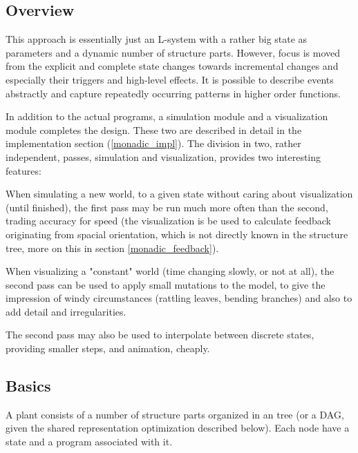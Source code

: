 




\subsection{Overview}


    This approach is essentially just an L-system with a
    rather big state as parameters and a dynamic number of
    structure parts.  However, focus is moved from the
    explicit and complete state changes towards incremental
    changes and especially their triggers and high-level
    effects. It is possible to describe events abstractly
    and capture repeatedly occurring patterns in higher
    order functions.

    In addition to the actual programs, a simulation module
    and a visualization module completes the design. These
    two are described in detail in the implementation
    section (\ref{monadic_impl}). The division in two,
    rather independent, passes, simulation and
    visualization, provides two interesting features:

    When simulating a new world, to a given state without
    caring about visualization (until finished), the
    first pass may be run much more often than the
    second, trading accuracy for speed (the visualization
    is be used to calculate feedback originating from
    spacial orientation, which is not directly known in the
    structure tree, more on this in section
    \ref{monadic_feedback}).

    When visualizing a "constant" world (time changing
    slowly, or not at all), the second pass can be used to
    apply small mutations to the model, to give the
    impression of windy circumstances (rattling leaves,
    bending branches) and also to add detail and
    irregularities. 

    The second pass may also be used to interpolate between
    discrete states, providing smaller steps, and animation,
    cheaply.



\subsection{Basics}

    A plant consists of a number of structure parts
    organized in an tree (or a DAG, given the shared
    representation optimization described below). Each node
    have a state and a program associated with it. 

